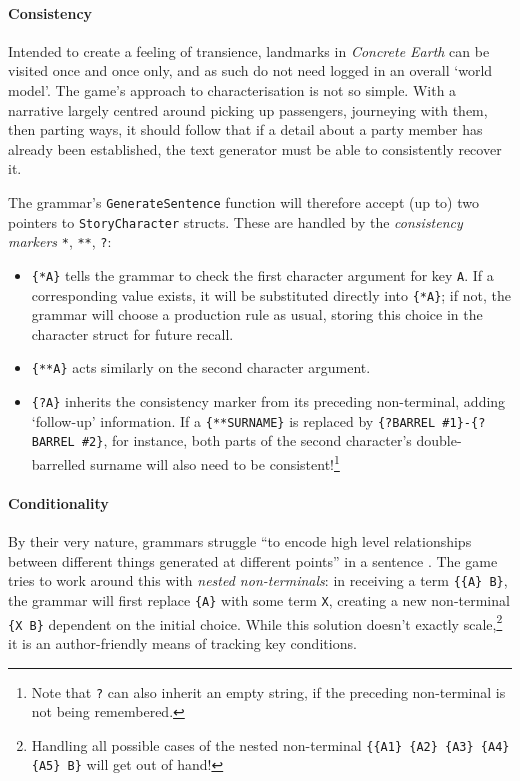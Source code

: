 \documentclass[a4paper, 11pt]{article}
\begin{document}
\begin{flushleft}
\paragraph{Consistency} Intended to create a feeling of transience, landmarks in \textit{Concrete Earth} can be visited once and once only, and as such do not need logged in an overall `world model'. The game's approach to characterisation is not so simple. With a narrative largely centred around picking up passengers, journeying with them, then parting ways, it should follow that if a detail about a party member has already been established, the text generator must be able to consistently recover it. %

\vspace{5pt}\noindent
The grammar's \texttt{GenerateSentence} function will therefore accept (up to) two pointers to \texttt{StoryCharacter} structs. These are handled by the \textit{consistency markers} \verb|*|, \verb|**|, \verb|?|: %
\begin{itemize}[noitemsep]
\item \verb|{*A}| tells the grammar to check the first character argument for key \verb|A|. If a corresponding value exists, it will be substituted directly into \verb|{*A}|; if not, the grammar will choose a production rule as usual, storing this choice in the character struct for future recall.
\item \verb|{**A}| acts similarly on the second character argument.
\item \verb|{?A}| inherits the consistency marker from its preceding non-terminal, adding `follow-up' information. If a \verb|{**SURNAME}| is replaced by \verb|{?BARREL #1}-{?BARREL #2}|, for instance, both parts of the second character's double-barrelled surname will also need to be consistent!\footnote{Note that \texttt{?} can also inherit an empty string, if the preceding non-terminal is not being remembered.}
\end{itemize}


\paragraph{Conditionality} By their very nature, grammars struggle ``to encode high level relationships between different things generated at different points'' in a sentence \citep{cmptn19}. The game tries to work around this with \textit{nested non-terminals}: in receiving a term \verb|{{A} B}|, the grammar will first replace \verb|{A}| with some term \verb|X|, creating a new non-terminal \verb|{X B}| dependent on the initial choice. While this solution doesn't exactly scale,\footnote{Handling all possible cases of the nested non-terminal \texttt{\{\{A1\} \{A2\} \{A3\} \{A4\} \{A5\} B\}} will get out of hand!} it is an author-friendly means of tracking key conditions.


\end{flushleft}
\end{document}
